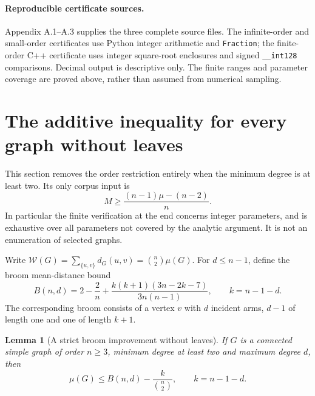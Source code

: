 \documentclass[11pt,a4paper]{article}
\newtheorem{lemma}[theorem]{Lemma}
\theoremstyle{remark}
\numberwithin{equation}{section}
\begin{document}
\paragraph{Reproducible certificate sources.}
Appendix A.1--A.3 supplies the three complete source files.
The infinite-order and small-order certificates use Python integer
arithmetic and \texttt{Fraction}; the finite-order C++ certificate uses
integer square-root enclosures and signed \texttt{\_\_int128} comparisons.
Decimal output is descriptive only. The finite ranges and parameter
coverage are proved above, rather than assumed from numerical sampling.


\section{The additive inequality for every graph without leaves}
\label{sec:ch-min-degree-two}

This section removes the order restriction entirely when the minimum
degree is at least two. Its only corpus input is
\[
 M\ge\frac{(n-1)\mu-(n-2)}n.\tag{U}
\]
In particular the finite verification at the end concerns integer
parameters, and is exhaustive over all parameters not covered by the
analytic argument. It is not an enumeration of selected graphs.

Write \(\mathcal W(G)=\sum_{\{u,v\}}d_G(u,v)=\binom n2\mu(G)\).
For \(d\le n-1\), define the broom mean-distance bound
\[
 B(n,d)=2-\frac2n+
 \frac{k(k+1)(3n-2k-7)}{3n(n-1)},\qquad k=n-1-d.
\]
The corresponding broom consists of a vertex \(v\) with \(d\) incident
arms, \(d-1\) of length one and one of length \(k+1\).

\begin{lemma}[A strict broom improvement without leaves]
\label{lem:ch-leafless-broom}
If \(G\) is a connected simple graph of order \(n\ge3\), minimum degree
at least two and maximum degree \(d\), then
\[
 \mu(G)\le B(n,d)-\frac{k}{\binom n2},
 \qquad k=n-1-d.
\]
\end{lemma}
\end{document}
